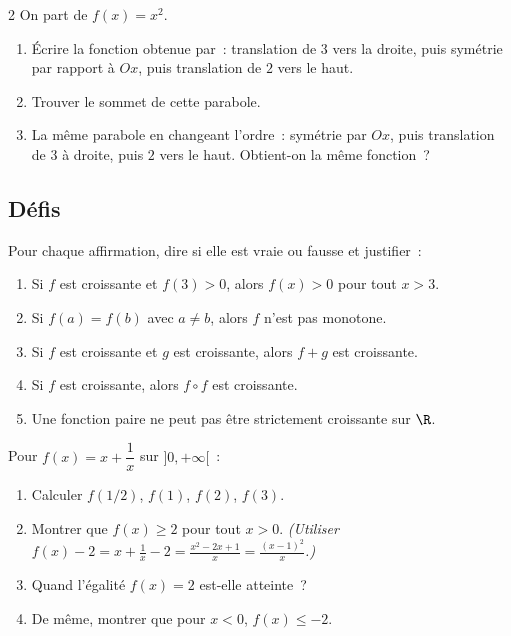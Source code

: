 \begin{probleme}{2}
On part de $f(x)=x^2$.
\begin{enumerate}
  \item \'Ecrire la fonction obtenue par~:
        translation de $3$ vers la droite, puis sym\'etrie par rapport \`a $Ox$,
        puis translation de $2$ vers le haut.
  \item Trouver le sommet de cette parabole.
  \item La m\^eme parabole en changeant l'ordre~:
        sym\'etrie par $Ox$, puis translation de $3$ \`a droite, puis $2$ vers le haut.
        Obtient-on la m\^eme fonction~?
\end{enumerate}
\end{probleme}

\subsection*{D\'efis}

\begin{challenge}
Pour chaque affirmation, dire si elle est vraie ou fausse et justifier~:
\begin{enumerate}
  \item \og Si $f$ est croissante et $f(3)>0$, alors $f(x)>0$ pour tout $x>3$.\fg
  \item \og Si $f(a)=f(b)$ avec $a\ne b$, alors $f$ n'est pas monotone.\fg
  \item \og Si $f$ est croissante et $g$ est croissante, alors $f+g$ est croissante.\fg
  \item \og Si $f$ est croissante, alors $f\circ f$ est croissante.\fg
  \item \og Une fonction paire ne peut pas \^etre strictement croissante sur $\R$.\fg
\end{enumerate}
\end{challenge}

\begin{challenge}[Minimum de $f(x)=x+1/x$]
Pour $f(x)=x+\dfrac{1}{x}$ sur $]0,+\infty[$~:
\begin{enumerate}
  \item Calculer $f(1/2)$, $f(1)$, $f(2)$, $f(3)$.
  \item Montrer que $f(x)\geq2$ pour tout $x>0$.
        \emph{(Utiliser $f(x)-2=x+\frac{1}{x}-2=\frac{x^2-2x+1}{x}=\frac{(x-1)^2}{x}$.)}
  \item Quand l'\'egalit\'e $f(x)=2$ est-elle atteinte~?
  \item De m\^eme, montrer que pour $x<0$, $f(x)\leq-2$.
\end{enumerate}
\end{challenge}

